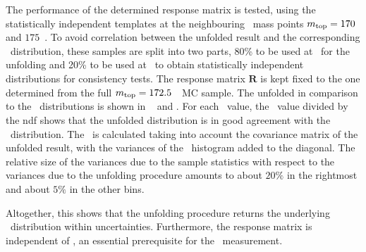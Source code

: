 The performance of the determined response matrix is tested, using the statistically independent templates at the neighbouring \tquark\ mass points $m_{\mathrm{top}}=170$ and $175$~\GeV. To avoid correlation between the unfolded result and the corresponding \truelevel\ distribution, these samples are split into two parts, 80\% to be used at \recolevel\ for the unfolding and 20\% to be used at \truelevel\ to obtain statistically independent distributions for consistency tests. 
%
The response matrix $\mathbf{R}$ is kept fixed to the one determined from the full $m_{\mathrm{top}}=172.5$~\GeV\ \gls{MC} sample.
%
The unfolded in comparison to the \truelevel\ distributions is shown in ~ and . For each \mt\ value, the \chiq\ value divided by the \gls{ndf} shows that the unfolded distribution is in good agreement with the \truelevel\ distribution. The \chiq\ is calculated taking into account the covariance matrix of the unfolded result, with the variances of the \truelevel\ histogram added to the diagonal. 
%
The relative size of the variances due to the sample statistics with respect to the variances due to the unfolding procedure amounts to about $20\%$ in the rightmost and about $5\%$ in the other bins.
%
%

Altogether, this shows that the unfolding procedure returns the underlying \truelevel\ distribution within uncertainties. Furthermore, the response matrix is independent of \mt, an essential pre\-requisite for the \mt\ measurement. 
%







